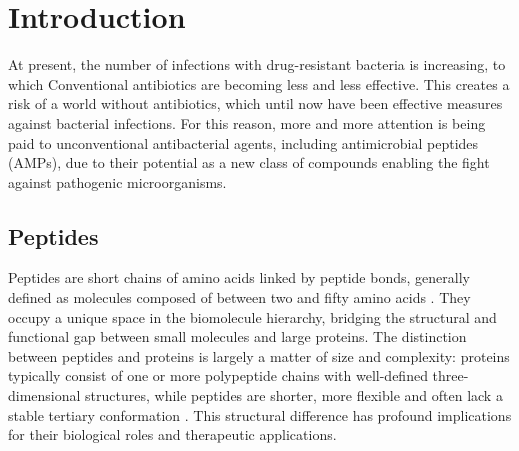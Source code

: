 \documentclass[a4paper,twoside,12pt]{book}
\newcounter{pagesWithoutNumbers}
\begin{document}
\setcounter{pagesWithoutNumbers}{\value{page}}
\mainmatter
\pagestyle{empty}

\cleardoublepage

\pagestyle{PageNumbersChapterTitles}


\chapter{Introduction}

At present, the number of infections with drug-resistant bacteria is increasing, to which Conventional antibiotics are becoming less and less effective. This creates a risk of a world without antibiotics, which until now have been effective measures against bacterial infections. For this reason, more and more attention is being paid to unconventional antibacterial agents, including antimicrobial peptides (AMPs), due to their potential as a new class of compounds enabling the fight against pathogenic microorganisms.\cite{bib:musser1995} 

\section{Peptides}

Peptides are short chains of amino acids linked by peptide bonds, generally defined as molecules composed of between two and fifty amino acids \cite{bib:lauj2018}. They occupy a unique space in the biomolecule hierarchy, bridging the structural and functional gap between small molecules and large proteins. The distinction between peptides and proteins is largely a matter of size and complexity: proteins typically consist of one or more polypeptide chains with well-defined three-dimensional structures, while peptides are shorter, more flexible and often lack a stable tertiary conformation \cite{bib:otvos2016}. This structural difference has profound implications for their biological roles and therapeutic applications.
\end{document}
